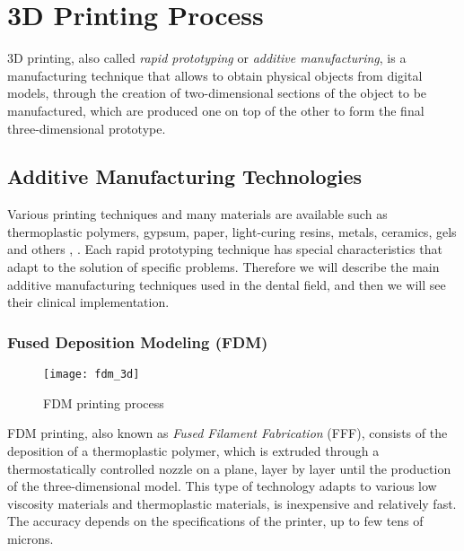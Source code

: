 
\chapter{3D Printing Process} %

\label{Chapter5} %


3D printing, also called \emph{rapid prototyping} or \emph{additive manufacturing}, is a manufacturing technique that allows to obtain physical objects from digital models, through the creation of two-dimensional sections of the object to be manufactured, which are produced one on top of the other to form the final three-dimensional prototype.

\section{Additive Manufacturing Technologies}
Various printing techniques and many materials are available such as thermoplastic polymers, gypsum, paper, light-curing resins, metals, ceramics, gels and others \parencite{Reference119}, \parencite{Reference120}. Each rapid prototyping technique has special characteristics that adapt to the solution of specific problems. Therefore we will describe the main additive manufacturing techniques used in the dental field, and then we will see their clinical implementation.

\subsection{Fused Deposition Modeling (FDM)}

\begin{wrapfigure} {R} {0.4\textwidth}
\vspace{-40pt}
	\begin{center}
	\texttt{[image: fdm\_3d]}
    \caption{FDM printing process}
    \label{fig:fdm_3d}
	\end{center}
\vspace{-40pt}
\end{wrapfigure}

FDM printing, also known as \emph{Fused Filament Fabrication} (FFF), consists of the deposition of a thermoplastic polymer, which is extruded through a thermostatically controlled nozzle on a plane, layer by layer until the production of the three-dimensional model. This type of technology adapts to various low viscosity materials and thermoplastic materials, is inexpensive and relatively fast. The accuracy depends on the specifications of the printer, up to few tens of microns.
\pagebreak

